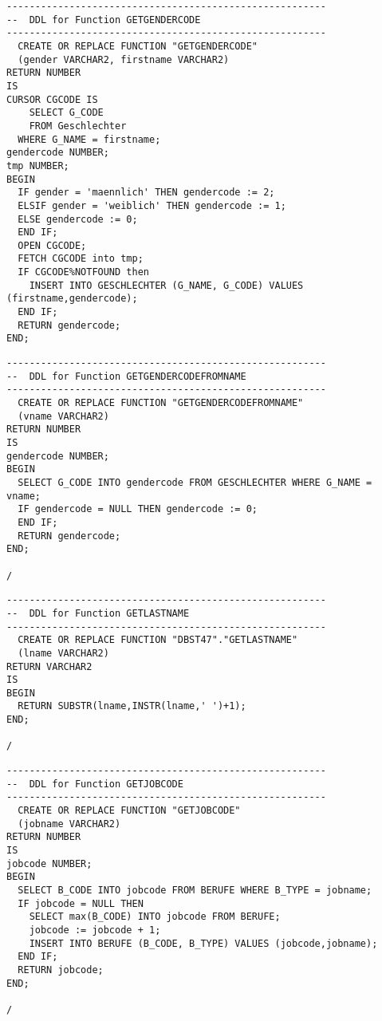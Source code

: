 \documentclass{scrartcl}
\begin{document}
\begin{lstlisting}
--------------------------------------------------------
--  DDL for Function GETGENDERCODE
--------------------------------------------------------
  CREATE OR REPLACE FUNCTION "GETGENDERCODE" 
  (gender VARCHAR2, firstname VARCHAR2)
RETURN NUMBER
IS
CURSOR CGCODE IS
	SELECT G_CODE
	FROM Geschlechter
  WHERE G_NAME = firstname;
gendercode NUMBER;
tmp NUMBER;
BEGIN
  IF gender = 'maennlich' THEN gendercode := 2; 
  ELSIF gender = 'weiblich' THEN gendercode := 1;
  ELSE gendercode := 0;
  END IF;
  OPEN CGCODE;
  FETCH CGCODE into tmp;
  IF CGCODE%NOTFOUND then 
    INSERT INTO GESCHLECHTER (G_NAME, G_CODE) VALUES (firstname,gendercode);
  END IF;
  RETURN gendercode;
END;
\end{lstlisting}

\begin{lstlisting}
--------------------------------------------------------
--  DDL for Function GETGENDERCODEFROMNAME
--------------------------------------------------------
  CREATE OR REPLACE FUNCTION "GETGENDERCODEFROMNAME" 
  (vname VARCHAR2)
RETURN NUMBER
IS
gendercode NUMBER;
BEGIN
  SELECT G_CODE INTO gendercode FROM GESCHLECHTER WHERE G_NAME = vname;
  IF gendercode = NULL THEN gendercode := 0; 
  END IF;
  RETURN gendercode;
END;

/
\end{lstlisting}

\begin{lstlisting}
--------------------------------------------------------
--  DDL for Function GETLASTNAME
--------------------------------------------------------
  CREATE OR REPLACE FUNCTION "DBST47"."GETLASTNAME" 
  (lname VARCHAR2)
RETURN VARCHAR2
IS
BEGIN
  RETURN SUBSTR(lname,INSTR(lname,' ')+1);
END;

/
\end{lstlisting}

\begin{lstlisting}
--------------------------------------------------------
--  DDL for Function GETJOBCODE
--------------------------------------------------------
  CREATE OR REPLACE FUNCTION "GETJOBCODE" 
  (jobname VARCHAR2)
RETURN NUMBER
IS
jobcode NUMBER;
BEGIN
  SELECT B_CODE INTO jobcode FROM BERUFE WHERE B_TYPE = jobname;
  IF jobcode = NULL THEN 
	SELECT max(B_CODE) INTO jobcode FROM BERUFE; 
	jobcode := jobcode + 1; 
	INSERT INTO BERUFE (B_CODE, B_TYPE) VALUES (jobcode,jobname); 
  END IF;
  RETURN jobcode;
END;

/

\end{lstlisting}
\end{document}
